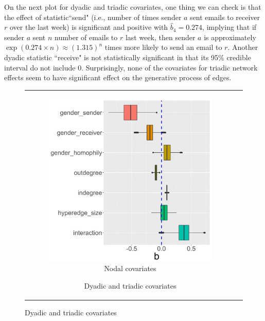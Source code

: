 \documentclass[ba]{imsart}
\numberwithin{equation}{section}
\theoremstyle{plain}
\begin{document}
	On the next plot for dyadic and triadic covariates, one thing we can check is that the effect of statistic``send" (i.e., number of times sender $a$ sent emails to receiver $r$ over the last week) is significant and positive with $\hat{b}_4 = 0.274$, implying that if sender $a$ sent $n$ number of emails to $r$ last week, then sender $a$ is approximately $\exp(0.274\times n)\approx(1.315)^n$ times more likely to send an email to $r$. Another dyadic statistic ``receive" is not statistically significant in that its 95\% credible interval do not include 0. Surprisingly, none of the covariates for triadic network effects seem to have significant effect on the generative process of edges.
		\begin{figure}[!t]
			\centering
			\begin{tabular}[t]{cc}
				\begin{subfigure}[b]{0.495\textwidth}
					\caption{Nodal covariates}
					\includegraphics[width=\textwidth]{img/betanewplot2-1.png}	
				\end{subfigure}
				\begin{subfigure}[b]{0.495\textwidth}
					\caption{Dyadic and triadic covariates}

\end{subfigure}
\end{tabular}
\end{figure}
\end{document}
